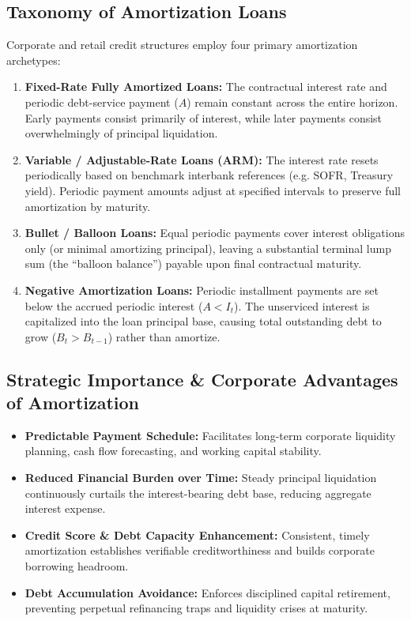 \subsection{Taxonomy of Amortization Loans}
Corporate and retail credit structures employ four primary amortization archetypes:
\begin{enumerate}[leftmargin=*, topsep=3pt, itemsep=4pt]
    \item \textbf{Fixed-Rate Fully Amortized Loans:} The contractual interest rate and periodic debt-service payment ($A$) remain constant across the entire horizon. Early payments consist primarily of interest, while later payments consist overwhelmingly of principal liquidation.
    \item \textbf{Variable / Adjustable-Rate Loans (ARM):} The interest rate resets periodically based on benchmark interbank references (e.g. SOFR, Treasury yield). Periodic payment amounts adjust at specified intervals to preserve full amortization by maturity.
    \item \textbf{Bullet / Balloon Loans:} Equal periodic payments cover interest obligations only (or minimal amortizing principal), leaving a substantial terminal lump sum (the ``balloon balance'') payable upon final contractual maturity.
    \item \textbf{Negative Amortization Loans:} Periodic installment payments are set below the accrued periodic interest ($A < I_t$). The unserviced interest is capitalized into the loan principal base, causing total outstanding debt to grow ($B_t > B_{t-1}$) rather than amortize.
\end{enumerate}

\subsection{Strategic Importance \& Corporate Advantages of Amortization}
\begin{itemize}[leftmargin=*, noitemsep, topsep=2pt]
    \item \textbf{Predictable Payment Schedule:} Facilitates long-term corporate liquidity planning, cash flow forecasting, and working capital stability.
    \item \textbf{Reduced Financial Burden over Time:} Steady principal liquidation continuously curtails the interest-bearing debt base, reducing aggregate interest expense.
    \item \textbf{Credit Score \& Debt Capacity Enhancement:} Consistent, timely amortization establishes verifiable creditworthiness and builds corporate borrowing headroom.
    \item \textbf{Debt Accumulation Avoidance:} Enforces disciplined capital retirement, preventing perpetual refinancing traps and liquidity crises at maturity.
\end{itemize}

